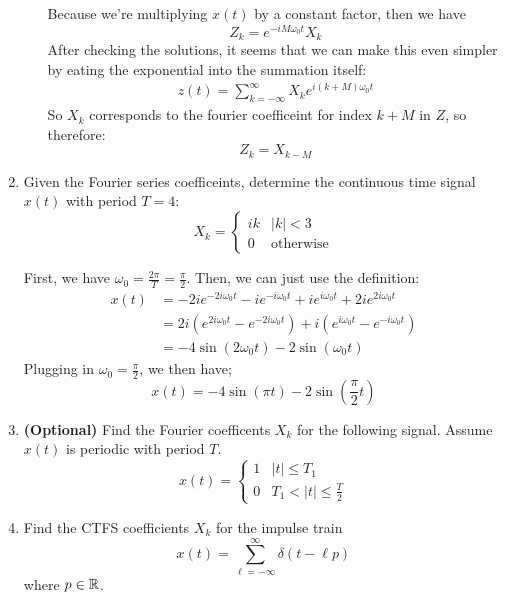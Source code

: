 \documentclass[10pt]{article}
\begin{document}
\begin{enumerate}[label=\alph*)]
\begin{enumerate}[label=\roman*)]
					\begin{solution}
						Because we're multiplying \( x(t)  \) by a constant factor, then we have
						\[
						Z_k = e^{-i M \omega_0 t} X_k
						\] 
						After checking the solutions, it seems that we can make this even simpler by eating the 
						exponential into the summation itself:
						\begin{align*}
							z(t) = \sum_{k=-\infty}^{\infty}X_k e^{i (k + M) \omega_0 t}
						\end{align*}
						So \( X_k \) corresponds to the fourier coefficeint for index \( k + M \) in \( Z \), so 
						therefore:
						\[
						Z_k = X_{k - M}
						\] 
					\end{solution}
			\end{enumerate}
		\item Given the Fourier series coefficeints, determine the continuous time signal \( x(t)  \) with 
			period \( T = 4 \):
			\[
			X_k = \begin{cases}
				ik & |k| <3\\
				0 & \text{otherwise}
			\end{cases}
			\] 

			\begin{solution}
				First, we have \( \omega_0 = \frac{2\pi}{T} = \frac{\pi}{2} \). Then, we can just use the definition:
				\begin{align*}
					x(t) &= -2ie^{-2i \omega_0 t} - ie^{-i \omega_0 t} + ie^{i \omega_0 t} + 2ie^{2 i \omega_0 t}\\
					&= 2i(e^{2 i \omega_0 t} - e^{-2i \omega_0 t}) + i(e^{i \omega_0 t} - e^{- i \omega_0 t})\\
					&= -4\sin(2 \omega_0 t) - 2\sin(\omega_0 t)
				\end{align*} 
				Plugging in \( \omega_0 = \frac{\pi}{2} \), we then have;
				\[
				x(t) = -4 \sin(\pi t) - 2 \sin(\frac{\pi}{2}t) 
				\] 
			\end{solution}

		\item \textbf{(Optional)} Find the Fourier coefficents \( X_k \) for the following signal. Assume 
			\( x(t)  \) is periodic with period \( T \). 
			\[
			x(t) = \begin{cases}
				1 & |t| \le T_1\\
				0 & T_1 < |t| \le  \frac{T}{2}
			\end{cases}
			\] 
		\item Find the CTFS coefficients \( X_k \) for the impulse train 
			\[
			x(t) = \sum_{\ell=-\infty}^{\infty} \delta(t - \ell p)
			\] 
			where \( p \in \mathbb R \). 


\end{enumerate}
\end{document}
